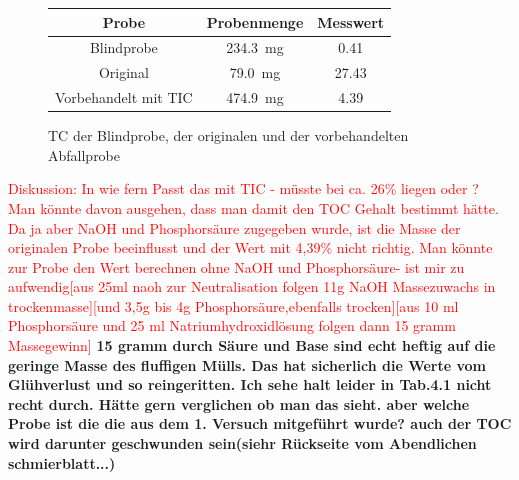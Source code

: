 \begin{figure}[h!]
	\renewcommand{\arraystretch}{1.2}
	\centering
	\caption{TC der Blindprobe, der originalen und der vorbehandelten Abfallprobe}
	\label{tab:tc_messung}
	\begin{tabular}{c|c|c}
		\hline
		\textbf{Probe} & \textbf{Probenmenge} & \textbf{Messwert}  \\
		\hline
		Blindprobe				&	\SI{234,3}{\milli \gram}	& \SI{0,41}{\mpercent}	\\
		Original				&	\SI{79,0}{\milli \gram}	& \SI{27,43}{\mpercent}		 \\
		Vorbehandelt mit TIC	&	\SI{474,9}{\milli \gram}	& \SI{4,39}{\mpercent}\\
		\hline
	\end{tabular}
\end{figure}
\FloatBarrier


\textcolor{red}{Diskussion: In wie fern Passt das mit TIC - müsste bei ca. 26\% liegen oder ?\\
Man könnte davon ausgehen, dass man damit den TOC Gehalt bestimmt hätte. Da ja aber NaOH und Phosphorsäure zugegeben wurde, ist die Masse der originalen Probe beeinflusst und der Wert mit 4,39\% nicht richtig. Man könnte zur Probe den Wert berechnen ohne NaOH und Phosphorsäure- ist mir zu aufwendig[aus 25ml naoh zur Neutralisation folgen 11g NaOH Massezuwachs in trockenmasse][und 3,5g bis 4g Phosphorsäure,ebenfalls trocken][aus 10 ml Phosphorsäure und 25 ml Natriumhydroxidlösung folgen dann 15 gramm Massegewinn]}
\textbf{15 gramm durch Säure und Base sind echt heftig auf die geringe Masse des fluffigen Mülls. Das hat sicherlich die Werte vom Glühverlust und so reingeritten. Ich sehe halt leider in Tab.4.1 nicht recht durch. Hätte gern verglichen ob man das sieht. aber welche Probe ist die die aus dem 1. Versuch mitgeführt wurde? 
	auch der TOC wird darunter geschwunden sein(siehr Rückseite vom Abendlichen schmierblatt...)}

